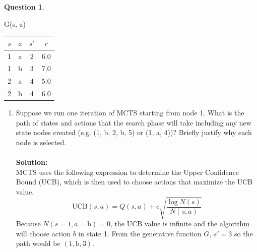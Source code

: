 \documentclass{article}
\theoremstyle{definition}
\newtheorem{question}[thm]{Question}
\begin{document}
\begin{question}
\begin{minipage}{0.5\textwidth}
    \end{minipage}
    \begin{minipage}{0.5\textwidth}
        \begin{center}
            G(s, a)\\
            \begin{tabular}{cc|cc}
                \toprule
                $s$ & $a$ & $s'$ & $r$ \\
                \midrule
                1 & a & 2 & 6.0 \\
                1 & b & 3 & 7.0 \\
                2 & a & 4 & 5.0 \\
                2 & b & 4 & 6.0 \\
                \bottomrule
            \end{tabular}
        \end{center}
    \end{minipage}
    \vspace{1cm}
    \begin{enumerate}[label=(\alph*)]
        \item Suppose we run one iteration of MCTS starting from node 1. What is the path of states and actions that the search phase will take including any new state nodes created (e.g. (1, b, 2, b, 5) or (1, a, 4))? Briefly justify why each node is selected.
        \\ \\ \noindent \textbf{Solution: }\\
        MCTS uses the following expression to determine the Upper Confidence Bound (UCB), which is then used to choose actions that maximize the UCB value.
        \begin{equation*}
            \text{UCB}(s,a) = Q(s,a) + c\sqrt{\frac{\log{N(s)}}{N(s,a)}}
        \end{equation*}
        Because $N(s=1,a=\text{b}) = 0$, the UCB value is infinite and the algorithm will choose action $b$ in state 1. From the generative function $G$, $s' = 3$ so the path would be $(1,\text{b},3)$.

\end{enumerate}
\end{question}
\end{document}
